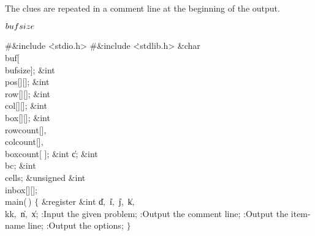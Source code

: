 The clues are repeated in a comment line at the beginning of the output.

\Y\B\4\D$\\{bufsize}$ \5
\par
\Y\B\8\#\&{include} \.{<stdio.h>}\6
\8\#\&{include} \.{<stdlib.h>}\6
\&{char} \\{buf}[\\{bufsize}];\6
\&{int} \\{pos}[][];\6
\&{int} \\{row}[][];\6
\&{int} \\{col}[][];\6
\&{int} \\{box}[][];\6
\&{int} \\{rowcount}[]${},{}$ \\{colcount}[]${},{}$ \\{boxcount}[%
];\6
\&{int} \|c;\6
\&{int} \\{bc};\6
\&{int} \\{cells};\6
\&{unsigned} \&{int} \\{inbox}[][];\7
\\{main}(\,)\1\1\2\2\6
${}\{{}$\1\6
\&{register} \&{int} \|d${},{}$ \|i${},{}$ \|j${},{}$ \|k${},{}$ \\{kk}${},{}$ %
\|n${},{}$ \|x;\7
:Input the given problem\X;\6
:Output the comment line\X;\6
:Output the item-name line\X;\6
:Output the options\X;\6
\4${}\}{}$\2\par
\fi

